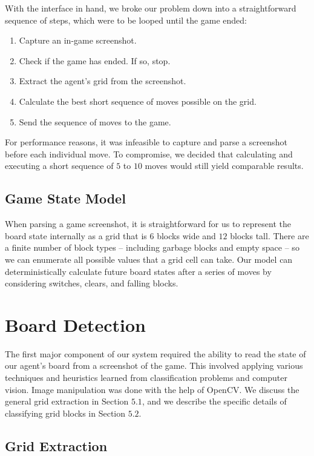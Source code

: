 \documentclass[12pt]{IEEEtran}
\begin{document}
With the interface in hand, we broke our problem down into a straightforward sequence of steps, which were to be looped until the game ended:
\begin{enumerate}
\item Capture an in-game screenshot.
\item Check if the game has ended. If so, stop.
\item Extract the agent's grid from the screenshot.
\item Calculate the best short sequence of moves possible on the grid.
\item Send the sequence of moves to the game.
\end{enumerate}
For performance reasons, it was infeasible to capture and parse a screenshot before each individual move. To compromise, we decided that calculating and executing a short sequence of $5$ to $10$ moves would still yield comparable results.

\subsection{Game State Model}

When parsing a game screenshot, it is straightforward for us to represent the board state internally as a grid that is $6$ blocks wide and $12$ blocks tall. There are a finite number of block types -- including garbage blocks and empty space -- so we can enumerate all possible values that a grid cell can take. Our model can deterministically calculate future board states after a series of moves by considering switches, clears, and falling blocks.

\section{Board Detection}

The first major component of our system required the ability to read the state of our agent's board from a screenshot of the game. This involved applying various techniques and heuristics learned from classification problems and computer vision. Image manipulation was done with the help of OpenCV. We discuss the general grid extraction in Section $5.1$, and we describe the specific details of classifying grid blocks in Section $5.2$.

\subsection{Grid Extraction}
\end{document}
